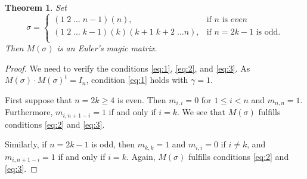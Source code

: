 \documentclass[10pt,a4paper]{amsart}
\newtheorem{theorem}{Theorem}
\begin{document}
\begin{theorem}
  Set \[ \sigma=
    \begin{cases}
      (1\;2\;\ldots\;n-1)(n),& \text{if }n\text{ is }even\\
      (1\;2\;\ldots\;k-1)(k)(k+1\;k+2\;\ldots n),& \text{if }n=2k-1%
                                                \text{ is odd.}\\
    \end{cases}
  \]
Then $M(\sigma)$ is an Euler's magic matrix.
\end{theorem}

\begin{proof}
  We need to verify the conditions \eqref{eq:1}, \eqref{eq:2}, and
  \eqref{eq:3}. As $M(\sigma)\cdot M(\sigma)^t=I_n$, condition
  \eqref{eq:1} holds with $\gamma=1$.
  
  First suppose that $n=2k\ge4$ is even. Then $m_{i,i}=0$ for
  $1\le i<n$ and $m_{n,n}=1$. Furthermore, $m_{i,n+1-i}=1$ if and only
  if $i=k$. We see that $M(\sigma)$ fulfills conditions \eqref{eq:2}
  and \eqref{eq:3}.

  Similarly, if $n=2k-1$ is odd, then $m_{k,k}=1$ and $m_{i,i}=0$ if
  $i\ne k$, and $m_{i, n+1-i}=1$ if and only if $i=k$. Again,
  $M(\sigma)$ fulfills conditions \eqref{eq:2} and \eqref{eq:3}.
\end{proof}
\end{document}
